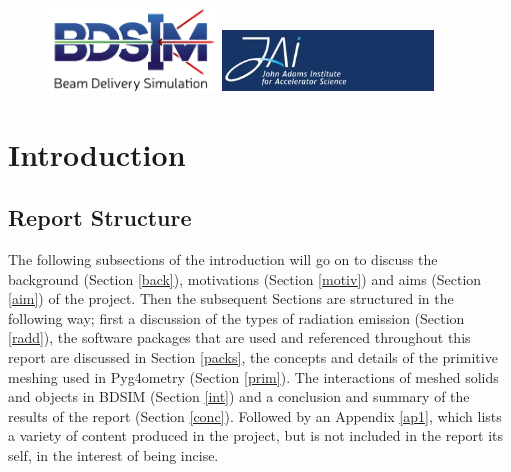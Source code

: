 \documentclass[12pt,a4paper]{article}
\begin{document}
\begin{titlepage}
\begin{figure}[h]
\centering
\begin{minipage}{.6\textwidth}
  \includegraphics[width=0.4\textwidth]{Images//Logos//BDSIM_Logo.jpg}
\end{minipage}%
\begin{minipage}{.6\textwidth}
  \centering
  \includegraphics[width=0.5\textwidth]{Images//Logos//JAI_Logo.jpeg}
  \end{minipage}
\end{figure}

\end{titlepage}
\leavevmode\thispagestyle{empty}\newpage
\tableofcontents
\normalsize
\thispagestyle{empty}
\newpage
\onecolumn

\small
\setcounter{page}{1}


\section{Introduction}

\subsection{Report Structure}
The following subsections of the introduction will go on to discuss the background (Section \ref{back}), motivations (Section \ref{motiv}) and aims (Section \ref{aim}) of the project. Then the subsequent Sections are structured in the following way; first a discussion of the types of radiation emission (Section \ref{radd}), the software packages that are used and referenced throughout this report are discussed in Section \ref{packs}, the concepts and details of the primitive meshing used in Pyg4ometry (Section \ref{prim}). The interactions of meshed solids and objects in BDSIM (Section \ref{int}) and a conclusion and summary of the results of the report (Section \ref{conc}). Followed by an Appendix \ref{ap1}, which lists a variety of content produced in the project, but is not included in the report its self, in the interest of being incise.
\end{document}
